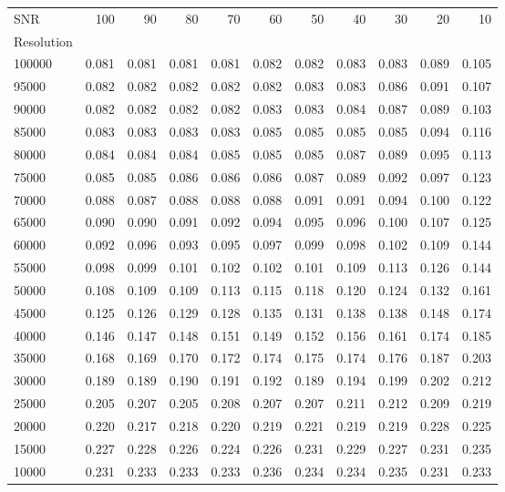 \documentclass[referee]{aa}
\begin{document}
\begin{table}[]
\begin{center}
{\begin{tabular}{l r r r r r r r r r r}
\hline
\hline
SNR & 100 & 90 & 80 & 70 & 60 & 50 & 40 & 30 & 20 & 10 \\
Resolution & & &    &    &    &    &    &    &    &    \\
\hline
100000 & 0.081 & 0.081 & 0.081 & 0.081 & 0.082 & 0.082 & 0.083 & 0.083 & 0.089 & 0.105 \\
95000 & 0.082 & 0.082 & 0.082 & 0.082 & 0.082 & 0.083 & 0.083 & 0.086 & 0.091 & 0.107 \\
90000 & 0.082 & 0.082 & 0.082 & 0.082 & 0.083 & 0.083 & 0.084 & 0.087 & 0.089 & 0.103 \\
85000 & 0.083 & 0.083 & 0.083 & 0.083 & 0.085 & 0.085 & 0.085 & 0.085 & 0.094 & 0.116 \\
80000 & 0.084 & 0.084 & 0.084 & 0.085 & 0.085 & 0.085 & 0.087 & 0.089 & 0.095 & 0.113 \\
75000 & 0.085 & 0.085 & 0.086 & 0.086 & 0.086 & 0.087 & 0.089 & 0.092 & 0.097 & 0.123 \\
70000 & 0.088 & 0.087 & 0.088 & 0.088 & 0.088 & 0.091 & 0.091 & 0.094 & 0.100 & 0.122 \\
65000 & 0.090 & 0.090 & 0.091 & 0.092 & 0.094 & 0.095 & 0.096 & 0.100 & 0.107 & 0.125 \\
60000 & 0.092 & 0.096 & 0.093 & 0.095 & 0.097 & 0.099 & 0.098 & 0.102 & 0.109 & 0.144 \\
55000 & 0.098 & 0.099 & 0.101 & 0.102 & 0.102 & 0.101 & 0.109 & 0.113 & 0.126 & 0.144 \\
50000 & 0.108 & 0.109 & 0.109 & 0.113 & 0.115 & 0.118 & 0.120 & 0.124 & 0.132 & 0.161 \\
45000 & 0.125 & 0.126 & 0.129 & 0.128 & 0.135 & 0.131 & 0.138 & 0.138 & 0.148 & 0.174 \\
40000 & 0.146 & 0.147 & 0.148 & 0.151 & 0.149 & 0.152 & 0.156 & 0.161 & 0.174 & 0.185 \\
35000 & 0.168 & 0.169 & 0.170 & 0.172 & 0.174 & 0.175 & 0.174 & 0.176 & 0.187 & 0.203 \\
30000 & 0.189 & 0.189 & 0.190 & 0.191 & 0.192 & 0.189 & 0.194 & 0.199 & 0.202 & 0.212 \\
25000 & 0.205 & 0.207 & 0.205 & 0.208 & 0.207 & 0.207 & 0.211 & 0.212 & 0.209 & 0.219 \\
20000 & 0.220 & 0.217 & 0.218 & 0.220 & 0.219 & 0.221 & 0.219 & 0.219 & 0.228 & 0.225 \\
15000 & 0.227 & 0.228 & 0.226 & 0.224 & 0.226 & 0.231 & 0.229 & 0.227 & 0.231 & 0.235 \\
10000 & 0.231 & 0.233 & 0.233 & 0.233 & 0.236 & 0.234 & 0.234 & 0.235 & 0.231 & 0.233 \\
\hline
\end{tabular}}


\end{center}
\end{table}
\end{document}
